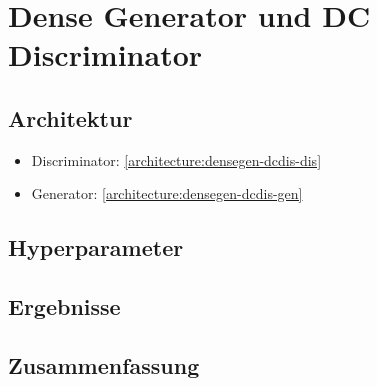 \section{Dense Generator und DC Discriminator}
\subsection{Architektur}
\begin{itemize}
	\item Discriminator: \cref{architecture:densegen-dcdis-dis}
	\item Generator: \cref{architecture:densegen-dcdis-gen}
\end{itemize}
\subsection{Hyperparameter}
\subsection{Ergebnisse}
\subsection{Zusammenfassung}
